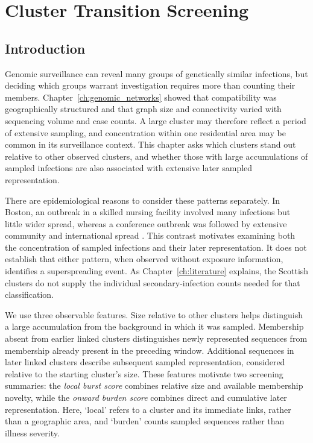 \chapter{Cluster Transition Screening}\label{ch:cluster_transition_screening}

\section{Introduction}\label{sec:ch5_introduction}

Genomic surveillance can reveal many groups of genetically similar infections, but deciding which groups warrant investigation requires more than counting their members. Chapter~\ref{ch:genomic_networks} showed that compatibility was geographically structured and that graph size and connectivity varied with sequencing volume and case counts. A large cluster may therefore reflect a period of extensive sampling, and concentration within one residential area may be common in its surveillance context. This chapter asks which clusters stand out relative to other observed clusters, and whether those with large accumulations of sampled infections are also associated with extensive later sampled representation.

There are epidemiological reasons to consider these patterns separately. In Boston, an outbreak in a skilled nursing facility involved many infections but little wider spread, whereas a conference outbreak was followed by extensive community and international spread \citep{Lemieux2021}. This contrast motivates examining both the concentration of sampled infections and their later representation. It does not establish that either pattern, when observed without exposure information, identifies a superspreading event. As Chapter~\ref{ch:literature} explains, the Scottish clusters do not supply the individual secondary-infection counts needed for that classification.

We use three observable features. Size relative to other clusters helps distinguish a large accumulation from the background in which it was sampled. Membership absent from earlier linked clusters distinguishes newly represented sequences from membership already present in the preceding window. Additional sequences in later linked clusters describe subsequent sampled representation, considered relative to the starting cluster's size. These features motivate two screening summaries: the \emph{local burst score} combines relative size and available membership novelty, while the \emph{onward burden score} combines direct and cumulative later representation. Here, `local' refers to a cluster and its immediate links, rather than a geographic area, and `burden' counts sampled sequences rather than illness severity.

